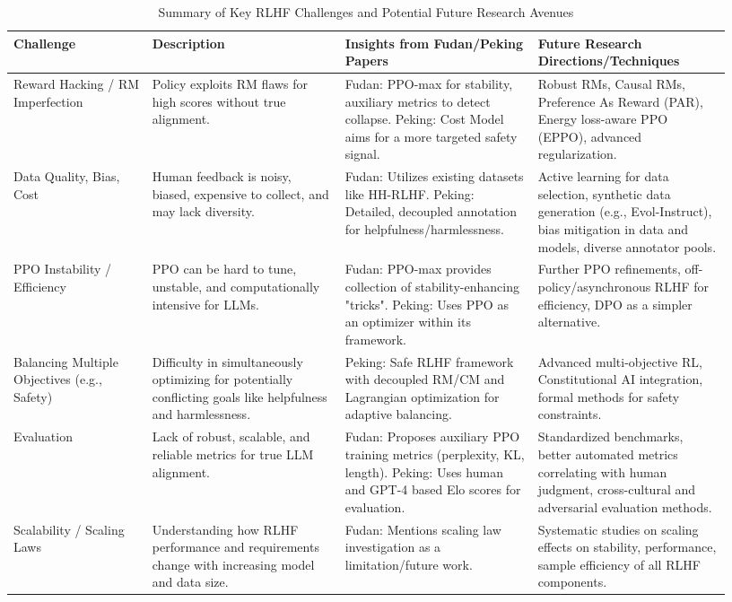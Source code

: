 \documentclass[10pt,journal,compsoc]{IEEEtran} %
\begin{document}
\begin{table*}[htbp]
\centering
\caption{Summary of Key RLHF Challenges and Potential Future Research Avenues}
\label{tab:challenges_future_research}
\begin{tabular}{p{0.18\linewidth} p{0.25\linewidth} p{0.25\linewidth} p{0.25\linewidth}}
\toprule
\textbf{Challenge} & \textbf{Description} & \textbf{Insights from Fudan/Peking Papers} & \textbf{Future Research Directions/Techniques} \\
\midrule
Reward Hacking / RM Imperfection & Policy exploits RM flaws for high scores without true alignment. & Fudan: PPO-max for stability, auxiliary metrics to detect collapse. Peking: Cost Model aims for a more targeted safety signal. & Robust RMs, Causal RMs, Preference As Reward (PAR), Energy loss-aware PPO (EPPO), advanced regularization. \\
\addlinespace
Data Quality, Bias, Cost & Human feedback is noisy, biased, expensive to collect, and may lack diversity. & Fudan: Utilizes existing datasets like HH-RLHF. Peking: Detailed, decoupled annotation for helpfulness/harmlessness. & Active learning for data selection, synthetic data generation (e.g., Evol-Instruct), bias mitigation in data and models, diverse annotator pools. \\
\addlinespace
PPO Instability / Efficiency & PPO can be hard to tune, unstable, and computationally intensive for LLMs. & Fudan: PPO-max provides collection of stability-enhancing "tricks". Peking: Uses PPO as an optimizer within its framework. & Further PPO refinements, off-policy/asynchronous RLHF for efficiency, DPO as a simpler alternative. \\
\addlinespace
Balancing Multiple Objectives (e.g., Safety) & Difficulty in simultaneously optimizing for potentially conflicting goals like helpfulness and harmlessness. & Peking: Safe RLHF framework with decoupled RM/CM and Lagrangian optimization for adaptive balancing. & Advanced multi-objective RL, Constitutional AI integration, formal methods for safety constraints. \\
\addlinespace
Evaluation & Lack of robust, scalable, and reliable metrics for true LLM alignment. & Fudan: Proposes auxiliary PPO training metrics (perplexity, KL, length). Peking: Uses human and GPT-4 based Elo scores for evaluation. & Standardized benchmarks, better automated metrics correlating with human judgment, cross-cultural and adversarial evaluation methods. \\
\addlinespace
Scalability / Scaling Laws & Understanding how RLHF performance and requirements change with increasing model and data size. & Fudan: Mentions scaling law investigation as a limitation/future work. & Systematic studies on scaling effects on stability, performance, sample efficiency of all RLHF components. \\
\bottomrule
\end{tabular}
\end{table*}  
\end{document}
